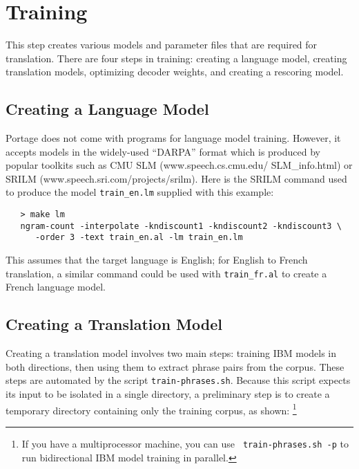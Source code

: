 \documentclass[11pt]{article}
\begin{document}
\section{Training} \label{Training}

This step creates various models and parameter files that are required for
translation. There are four steps in training: creating a language model,
creating translation models, optimizing decoder weights, and creating a
rescoring model.

\subsection{Creating a Language Model} \label{LM}

Portage does not come with programs for language model training. However,
it accepts models in the widely-used ``DARPA'' format which is produced by popular
toolkits such as CMU SLM (www.speech.cs.cmu.edu/ SLM\_info.html) or SRILM
(www.speech.sri.com/projects/srilm). Here is the SRILM command used to produce
the model {\tt train\_en.lm} supplied with this example:
\begin{verbatim}
   > make lm
   ngram-count -interpolate -kndiscount1 -kndiscount2 -kndiscount3 \
      -order 3 -text train_en.al -lm train_en.lm
\end{verbatim}
This assumes that the target language is English; for English to French
translation, a similar command could be used with {\tt train\_fr.al} to create
a French language model.

\subsection{Creating a Translation Model} \label{TM}

Creating a translation model involves two main steps: training IBM models in
both directions, then using them to extract phrase pairs from the corpus. These
steps are automated by the script {\tt train-phrases.sh}.  Because this script
expects its input to be isolated in a single directory, a preliminary step is
to create a temporary directory containing only the training corpus, as shown:
\footnote{If you have a multiprocessor machine, you can use {\tt
    train-phrases.sh -p} to run bidirectional IBM model training in parallel.}
\end{document}
